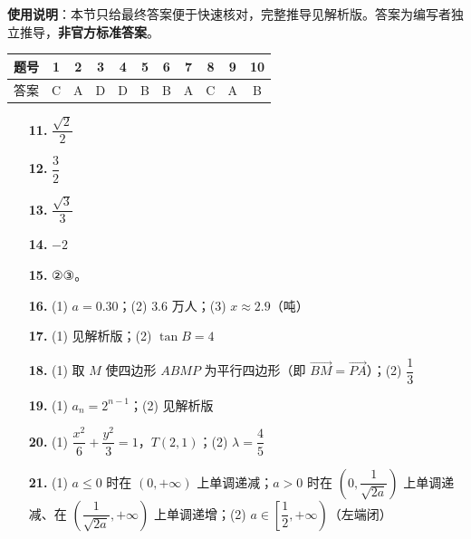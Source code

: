 
\begin{gknotice}
\textbf{使用说明}：本节只给最终答案便于快速核对，完整推导见解析版。答案为编写者独立推导，\textbf{非官方标准答案}。
\end{gknotice}

\begin{center}\begin{tabular}{ccccccccccc}
\toprule
题号 & 1 & 2 & 3 & 4 & 5 & 6 & 7 & 8 & 9 & 10 \\
\midrule
答案 & C & A & D & D & B & B & A & C & A & B \\
\bottomrule
\end{tabular}\end{center}

\begin{itemize}[leftmargin=2.6em]
  \item[\textbf{11.}] \(\dfrac{\sqrt{2}}{2}\)
  \item[\textbf{12.}] \(\dfrac{3}{2}\)
  \item[\textbf{13.}] \(\dfrac{\sqrt{3}}{3}\)
  \item[\textbf{14.}] \(-2\)
  \item[\textbf{15.}] ②③。
\end{itemize}

\begin{itemize}[leftmargin=2.6em]
  \item[\textbf{16.}] (1) \(a=0.30\)；(2) \(3.6\) 万人；(3) \(x\approx2.9\)（吨）
  \item[\textbf{17.}] (1) 见解析版；(2) \(\tan B=4\)
  \item[\textbf{18.}] (1) 取 \(M\) 使四边形 \(ABMP\) 为平行四边形（即 \(\overrightarrow{BM}=\overrightarrow{PA}\)）；(2) \(\dfrac{1}{3}\)
  \item[\textbf{19.}] (1) \(a_{n}=2^{n-1}\)；(2) 见解析版
  \item[\textbf{20.}] (1) \(\dfrac{x^{2}}{6}+\dfrac{y^{2}}{3}=1\)，\(T(2,1)\)；(2) \(\lambda=\dfrac{4}{5}\)
  \item[\textbf{21.}] (1) \(a\leqslant0\) 时在 \((0,+\infty)\) 上单调递减；\(a>0\) 时在 \((0,\dfrac{1}{\sqrt{2a}})\) 上单调递减、在 \((\dfrac{1}{\sqrt{2a}},+\infty)\) 上单调递增；(2) \(a\in\left[\dfrac{1}{2},+\infty\right)\)（左端闭）
\end{itemize}
